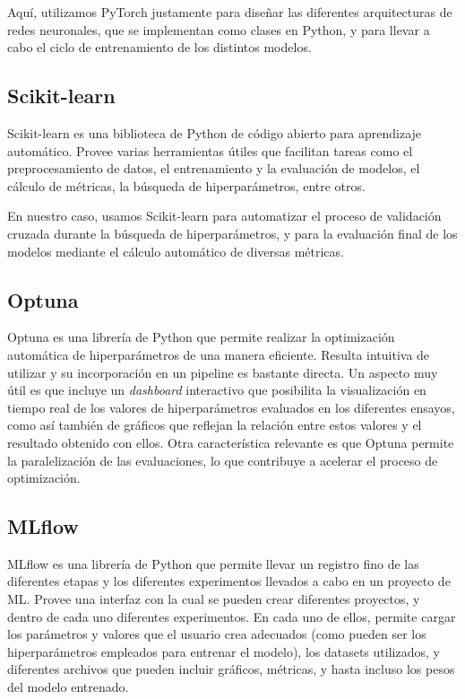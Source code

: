 \documentclass[../../main.tex]{subfiles}
\begin{document}
Aquí, utilizamos PyTorch justamente para diseñar las diferentes arquitecturas de redes
neuronales, que se implementan como clases en Python, y para llevar a cabo el ciclo de
entrenamiento de los distintos modelos.

\subsection{Scikit-learn}
Scikit-learn \cite{scikitlearn-docs} es una biblioteca de Python de código abierto para
aprendizaje automático. Provee varias herramientas útiles que facilitan tareas como el
preprocesamiento de datos, el entrenamiento y la evaluación de modelos, el cálculo de
métricas, la búsqueda de hiperparámetros, entre otros.

En nuestro caso, usamos Scikit-learn para automatizar el proceso de validación cruzada
durante la búsqueda de hiperparámetros, y para la evaluación final de los modelos mediante
el cálculo automático de diversas métricas.

\subsection{Optuna}
Optuna \cite{optuna-docs} es una librería de Python que permite realizar la optimización
automática de hiperparámetros de una manera eficiente. Resulta intuitiva de utilizar y su
incorporación en un pipeline es bastante directa. Un aspecto muy útil es que incluye un
\textit{dashboard} interactivo que posibilita la visualización en tiempo real de los
valores de hiperparámetros evaluados en los diferentes ensayos, como así también de
gráficos que reflejan la relación entre estos valores y el resultado obtenido con ellos.
Otra característica relevante es que Optuna permite la paralelización de las evaluaciones,
lo que contribuye a acelerar el proceso de optimización.

\subsection{MLflow}
MLflow \cite{mlflow-docs} es una librería de Python que permite llevar un registro fino de
las diferentes etapas y los diferentes experimentos llevados a cabo en un proyecto de ML.
Provee una interfaz con la cual se pueden crear diferentes proyectos, y dentro de cada uno
diferentes experimentos. En cada uno de ellos, permite cargar los parámetros y valores que
el usuario crea adecuados (como pueden ser los hiperparámetros empleados para entrenar el
modelo), los datasets utilizados, y diferentes archivos que pueden incluir gráficos,
métricas, y hasta incluso los pesos del modelo entrenado.
\end{document}
